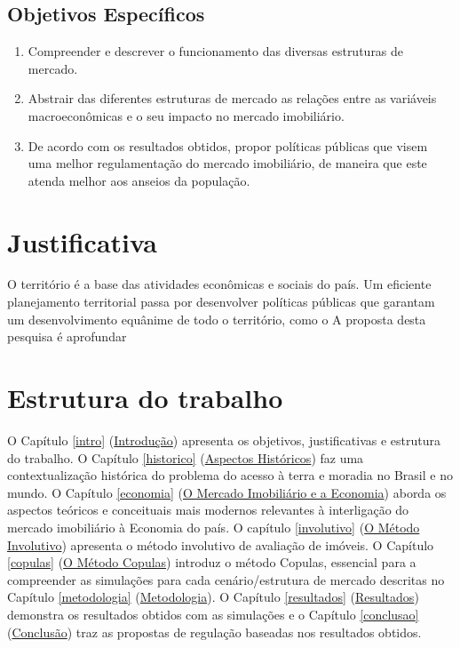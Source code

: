 \documentclass[
	12pt,				%
	oneside,			%
	a4paper,			%
	chapter=TITLE,		%
	section=TITLE,		%
	english,			%
	brazil				%
	]{abntex2}
\begin{document}
\hypertarget{objetivos-especuxedficos}{%
\subsection{Objetivos Específicos}\label{objetivos-especuxedficos}}
\begin{enumerate}
\def\labelenumi{\arabic{enumi}.}
\tightlist
\item
  Compreender e descrever o funcionamento das diversas estruturas de mercado.
\item
  Abstrair das diferentes estruturas de mercado as relações entre as variáveis
  macroeconômicas e o seu impacto no mercado imobiliário.
\item
  De acordo com os resultados obtidos, propor políticas públicas que visem uma
  melhor regulamentação do mercado imobiliário, de maneira que este atenda melhor
  aos anseios da população.
\end{enumerate}
\hypertarget{justificativa}{%
\section{Justificativa}\label{justificativa}}

O território é a base das atividades econômicas e sociais do país. Um eficiente
planejamento territorial passa por desenvolver políticas públicas que garantam
um desenvolvimento equânime de todo o território, como o A proposta desta
pesquisa é aprofundar

\hypertarget{estrutura-do-trabalho}{%
\section{Estrutura do trabalho}\label{estrutura-do-trabalho}}

O Capítulo \ref{intro} (\protect\hyperlink{intro}{Introdução}) apresenta os objetivos, justificativas e
estrutura do trabalho. O Capítulo \ref{historico} (\protect\hyperlink{historico}{Aspectos Históricos}) faz
uma contextualização histórica do problema do acesso à terra e moradia no Brasil
e no mundo. O Capítulo \ref{economia} (\protect\hyperlink{economia}{O Mercado Imobiliário e a Economia})
aborda os aspectos teóricos e conceituais mais modernos relevantes à
interligação do mercado imobiliário à Economia do país. O capítulo
\ref{involutivo} (\protect\hyperlink{involutivo}{O Método Involutivo}) apresenta o método involutivo de
avaliação de imóveis. O Capítulo \ref{copulas} (\protect\hyperlink{copulas}{O Método Copulas}) introduz o
método Copulas, essencial para a compreender as simulações para cada
cenário/estrutura de mercado descritas no Capítulo \ref{metodologia}
(\protect\hyperlink{metodologia}{Metodologia}). O Capítulo \ref{resultados} (\protect\hyperlink{resultados}{Resultados}) demonstra os
resultados obtidos com as simulações e o Capítulo \ref{conclusao}
(\protect\hyperlink{conclusao}{Conclusão}) traz as propostas de regulação baseadas nos resultados obtidos.
\end{document}
